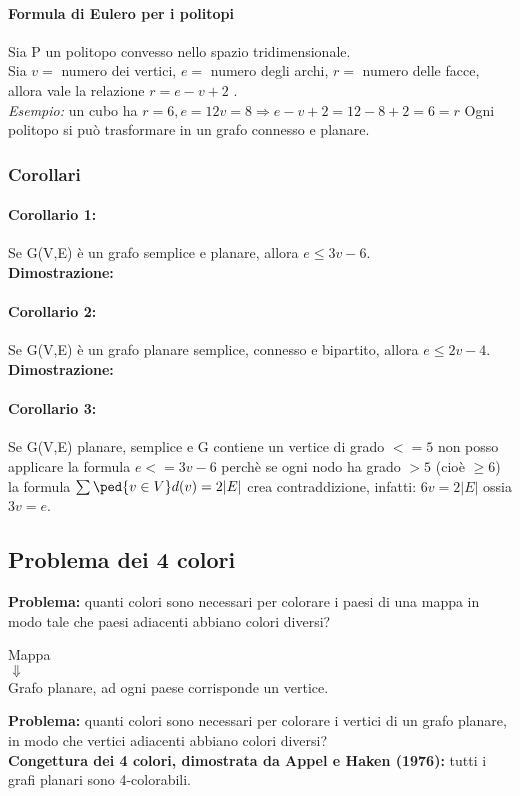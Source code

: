 \paragraph{Formula di Eulero per i politopi}
Sia P un politopo convesso nello spazio tridimensionale. \\
Sia \(v =\) numero dei vertici,
\(e =\) numero degli archi,
\(r =\) numero delle facce,
allora vale la relazione \(r = e - v + 2\) . \\
\textit{Esempio:} un cubo ha \(r=6, e=12 v=8 \Rightarrow e- v+2=12-8+2=6=r\)
Ogni politopo si può trasformare in un grafo connesso e planare.

\subsubsection{Corollari}
\paragraph{Corollario 1:} Se G(V,E) è un grafo semplice e planare, allora \(e \leq 3v - 6\). \\
\textbf{Dimostrazione:}

\paragraph{Corollario 2:} Se G(V,E) è un grafo planare semplice, connesso e bipartito, allora \(e \leq 2v - 4\).\\
\textbf{Dimostrazione:}

\paragraph{Corollario 3:} Se G(V,E) planare, semplice e G contiene un vertice di grado \(<= 5\) non posso applicare la formula \(e<=3v-6\) perchè se ogni nodo ha grado $>5$ (cioè $\geq 6$) la formula \(\sum \ped{v \in V} d(v) = 2 |E| \) crea contraddizione, infatti: \(6v = 2|E|\) ossia \(3v = e\). 

\subsection{Problema dei 4 colori}
\textbf{Problema:} quanti colori sono necessari per colorare i paesi di una
mappa in modo tale che paesi adiacenti abbiano colori diversi?
\begin{center}
Mappa \\
\(\Downarrow \) \\
Grafo planare, ad ogni paese corrisponde un vertice.
\end{center}
\textbf{Problema:} quanti colori sono necessari per colorare i vertici di un grafo
planare, in modo che vertici adiacenti abbiano colori diversi? \\

\noindent
\textbf{Congettura dei 4 colori, dimostrata da Appel e Haken (1976):} tutti i grafi planari sono 4-colorabili.


\newpage
